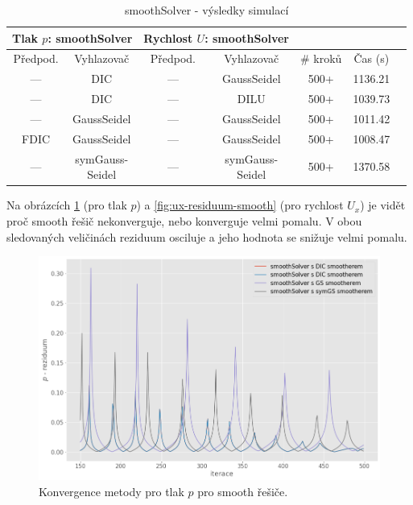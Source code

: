 \documentclass[a4paper,12pt]{report}
\theoremstyle{remark}
\begin{document}
 \begin{table}[H]
	\centering
	\caption{smoothSolver - výsledky simulací}
	\renewcommand{\arraystretch}{1.9}
	\begin{tabular}{*7c}
		\toprule
\multicolumn{2}{c}{Tlak $p$: \textbf{smoothSolver}} & \multicolumn{2}{c}{Rychlost $U$: \textbf{smoothSolver}}\\
	\midrule
	Předpod.&Vyhlazovač&Předpod.&Vyhlazovač&\# kroků&Čas (s)\\
	\midrule		
	 --- & DIC &  --- & GaussSeidel &500+&1136.21\\	
	 --- & DIC & --- & DILU &500+&1039.73\\
	 --- & GaussSeidel &   --- & GaussSeidel &500+&1011.42\\		
	 FDIC & GaussSeidel &  --- & GaussSeidel &500+&1008.47\\
	 --- & \shortstack{symGauss-\\Seidel} &  --- & \shortstack{symGauss-\\Seidel}&500+&1370.58\\
	\bottomrule
\end{tabular}
\label{table:solvers_smooth}
\end{table}

Na obrázcích \ref{fig:p-residuum-smooth} (pro tlak $p$) a \ref{fig:ux-residuum-smooth} (pro rychlost $U_x$) je vidět proč smooth řešič nekonverguje, nebo konverguje velmi pomalu. V obou sledovaných veličinách reziduum osciluje a jeho hodnota se snižuje velmi pomalu.

\begin{figure}[H]
	\centering
	\includegraphics[width=1\linewidth]{p-residuum-smooth.png}
	\caption{Konvergence metody pro tlak $p$ pro smooth řešiče.}
	\label{fig:p-residuum-smooth}
\end{figure}
\end{document}
